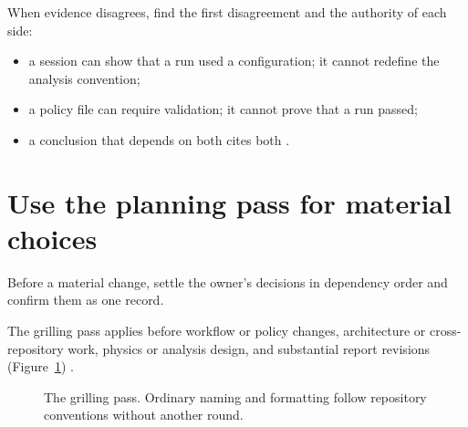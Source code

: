 When evidence disagrees, find the first disagreement and the authority of each side:
\begin{itemize}
  \item a session can show that a run used a configuration; it cannot redefine the analysis
        convention;
  \item a policy file can require validation; it cannot prove that a run passed;
  \item a conclusion that depends on both cites both \cite[Source traceability and
          corroboration]{skill:report-production}.
\end{itemize}

\section{Use the planning pass for material choices}

\begin{headline}
  Before a material change, settle the owner's decisions in dependency order and confirm
  them as one record.
\end{headline}

The grilling pass applies before workflow or policy changes, architecture or
cross-repository work, physics or analysis design, and substantial report revisions
(Figure~\ref{fig:grilling}) \cite[Establish the decision tree; Work the
  frontier]{skill:grilling}.

\begin{figure}[H]
  \centering
  \caption{The grilling pass. Ordinary naming and formatting follow repository conventions
    without another round.}
  \label{fig:grilling}
\end{figure}

